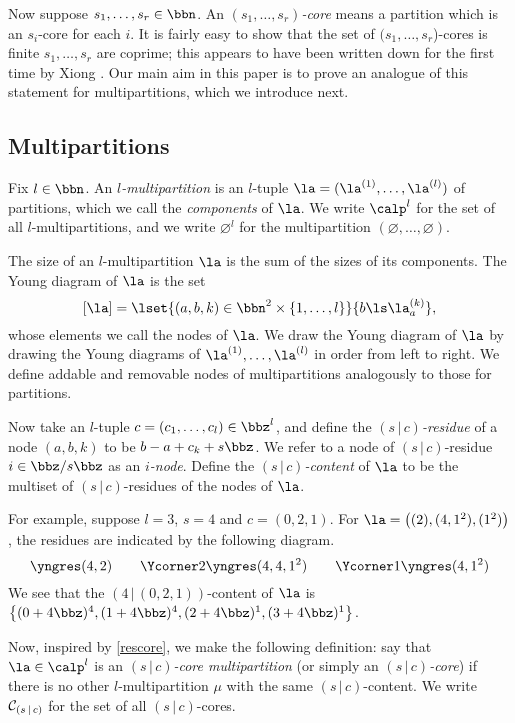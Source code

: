 \documentclass[a4paper, 11pt, twoside]{article}
\begin{document}
Now suppose $s_1,\dots,s_r\in\bbn$. An \emph{$(s_1,\dots,s_r)$-core} means a partition which is an $s_i$-core for each $i$. It is fairly easy to show that the set of $(s_1,\dots,s_r$)-cores is finite \iff $s_1,\dots,s_r$ are coprime; this appears to have been written down for the first time by Xiong \cite[Theorem 1.1]{xiong}. Our main aim in this paper is to prove an analogue of this statement for multipartitions, which we introduce next.

\subsection{Multipartitions}\label{multipintrosec}

Fix $l\in\bbn$. An \emph{$l$-multipartition} is an $l$-tuple $\la=(\la^{(1)},\dots,\la^{(l)})$ of partitions, which we call the \emph{components} of $\la$. We write $\calp^l$ for the set of all $l$-multipartitions, and we write $\varnothing^l$ for the multipartition $(\varnothing,\dots,\varnothing)$.

The size of an $l$-multipartition $\la$ is the sum of the sizes of its components. The Young diagram of $\la$ is the set
\[
[\la]=\lset{(a,b,k)\in\bbn^2\times\{1,\dots,l\}}{b\ls\la^{(k)}_a},
\]
whose elements we call the nodes of $\la$. We draw the Young diagram of $\la$ by drawing the Young diagrams of $\la^{(1)},\dots,\la^{(l)}$ in order from left to right. We define addable and removable nodes of multipartitions analogously to those for partitions.

Now take an $l$-tuple $c=(c_1,\dots,c_l)\in\bbz^l$, and define the \emph{$(s\,|\,c)$-residue} of a node $(a,b,k)$ to be $b-a+c_k+s\bbz$. We refer to a node of $(s\,|\,c)$-residue $i\in\zsz$ as an \emph{$i$-node}. Define the \emph{$(s\,|\,c)$-content} of $\la$ to be the multiset of $(s\,|\,c)$-residues of the nodes of $\la$.

For example, suppose $l=3$, $s=4$ and $c=(0,2,1)$. For $\la=\left((2),(4,1^2),(1^2)\right)$, the residues are indicated by the following diagram.
\[
\yngres(4,2)\qquad\Ycorner2\yngres(4,4,1^2)\qquad\Ycorner1\yngres(4,1^2)
\]
We see that the $(4\,|\,(0,2,1))$-content of $\la$ is $\left\{(0+4\bbz)^4,(1+4\bbz)^4,(2+4\bbz)^1,(3+4\bbz)^1\right\}$.

Now, inspired by \cref{rescore}, we make the following definition: say that $\la\in\calp^l$ is an \emph{$(s\,|\,c)$-core multipartition} (or simply an \emph{$(s\,|\,c)$-core}) if there is no other $l$-multipartition $\mu$ with the same $(s\,|\,c)$-content. We write $\mathcal{C}_{(s\,|\,c)}$ for the set of all $(s\,|\,c)$-cores.
\end{document}
